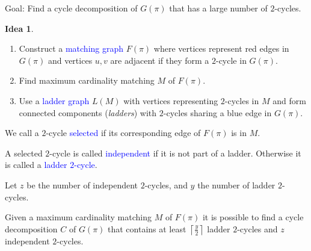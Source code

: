 \documentclass{beamer}
\theoremstyle{definition}
\newtheorem{idea}[theorem]{Idea}
\def\padding{\vspace{0.5cm}}
\def\spadding{\vspace{0.25cm}}
\def\b{\textcolor{blue}}
\begin{document}
\begin{frame}

Goal: Find a cycle decomposition of $G(\pi)$ that has a large number of $2$-cycles.\pause

\begin{idea}
\begin{enumerate}
    \item Construct a \b{matching graph} $F(\pi)$ where vertices represent red edges in $G(\pi)$ and vertices $u, v$ are adjacent if they form a $2$-cycle in $G(\pi)$. \par\pause
    \item Find maximum cardinality matching $M$ of $F(\pi)$.\pause
    \item Use a \b{ladder graph} $L(M)$ with vertices representing $2$-cycles in $M$ and form connected components (\textit{ladders}) with $2$-cycles sharing a blue edge in $G(\pi)$.
\end{enumerate}
\end{idea}

\end{frame}

\begin{frame}

\begin{definition}
We call a $2$-cycle \b{selected} if its corresponding edge of $F(\pi)$ is in $M$.\pause\spadding

A selected $2$-cycle is called \b{independent} if it is not part of a ladder. Otherwise it is called a \b{ladder $2$-cycle}.
\end{definition}\pause\padding

Let $z$ be the number of independent $2$-cycles, and $y$ the number of ladder $2$-cycles.\pause

\begin{theorem}
\label{thm:5}
Given a maximum cardinality matching $M$ of $F(\pi)$ it is possible to find a cycle decomposition $C$ of $G(\pi)$ that contains at least $\left\lceil \frac{y}{2} \right\rceil$ ladder $2$-cycles and $z$ independent $2$-cycles.
\end{theorem}


\end{frame}
\end{document}
